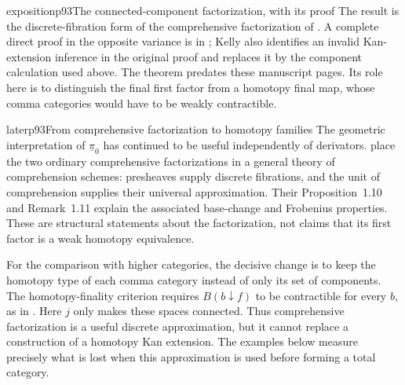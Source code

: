 \begin{dcomment}{exposition}{p93}{The connected-component factorization, with its proof}
The result is the discrete-fibration form of the comprehensive factorization of \citet{StreetWalters1973}. A complete direct proof in the opposite variance is in \citet[\S4.7, pp.~73--75, especially (4.77)--(4.79)]{Kelly1982}; Kelly also identifies an invalid Kan-extension inference in the original proof and replaces it by the component calculation used above. The theorem predates these manuscript pages. Its role here is to distinguish the final first factor from a homotopy final map, whose comma categories would have to be weakly contractible.
\end{dcomment}

\begin{dcomment}{later}{p93}{From comprehensive factorization to homotopy families}
The geometric interpretation of $\underline\pi_0$ has continued to be useful independently of derivators. \citet[\S1.3, Lemma~1.6, and Theorem~1.7]{BergerKaufmann2017} place the two ordinary comprehensive factorizations in a general theory of comprehension schemes: presheaves supply discrete fibrations, and the unit of comprehension supplies their universal approximation. Their Proposition~1.10 and Remark~1.11 explain the associated base-change and Frobenius properties. These are structural statements about the factorization, not claims that its first factor is a weak homotopy equivalence.

For the comparison with higher categories, the decisive change is to keep the homotopy type of each comma category instead of only its set of components. The homotopy-finality criterion requires $B(b\downarrow f)$ to be contractible for every $b$, as in \citet[Theorem~4.1.3.1]{Lurie2009HTT}. Here $j$ only makes these spaces connected. Thus comprehensive factorization is a useful discrete approximation, but it cannot replace a construction of a homotopy Kan extension. The examples below measure precisely what is lost when this approximation is used before forming a total category.
\end{dcomment}

